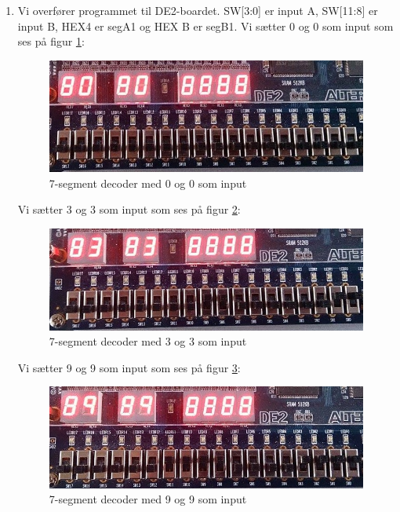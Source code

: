 \begin{enumerate}
\item[2)]
Vi overfører programmet til DE2-boardet. SW[3:0] er input A, SW[11:8] er input B, HEX4 er segA1 og HEX B er segB1. Vi sætter 0 og 0 som input som ses på figur \ref{fig:7SegDecoder00}:
	\begin{figure}[h]
		\centering
		\includegraphics[scale=0.6]{pictures/Oevelse4/BCD_adder/BCD_1seg_00.jpg}
		\caption{7-segment decoder med 0 og 0 som input}
		\label{fig:7SegDecoder00}
	\end{figure}
	Vi sætter 3 og 3 som input som ses på figur \ref{fig:7SegDecoder33}:
	\begin{figure}[h]
		\centering
		\includegraphics[scale=0.6]{pictures/Oevelse4/BCD_adder/BCD_1seg_33.jpg}
		\caption{7-segment decoder med 3 og 3 som input}
		\label{fig:7SegDecoder33}
	\end{figure}
	Vi sætter 9 og 9 som input som ses på figur \ref{fig:7SegDecoder99}:
	\begin{figure}[h]
		\centering
		\includegraphics[scale=0.6]{pictures/Oevelse4/BCD_adder/BCD_1seg_99.jpg}
		\caption{7-segment decoder med 9 og 9 som input}
		\label{fig:7SegDecoder99}
	\end{figure}
	

\end{enumerate}
